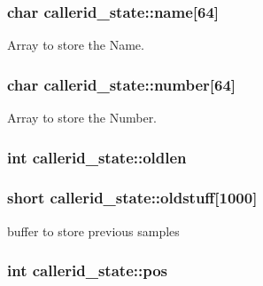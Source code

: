 \subsubsection[{name}]{\setlength{\rightskip}{0pt plus 5cm}char callerid\+\_\+state\+::name\mbox{[}64\mbox{]}}\label{structcallerid__state_a521ec0abccd42445c58230ba7cb4856d}


Array to store the Name. 

\hypertarget{structcallerid__state_af7151357841b78dcfcb62e58de1cbeb2}{}
\subsubsection[{number}]{\setlength{\rightskip}{0pt plus 5cm}char callerid\+\_\+state\+::number\mbox{[}64\mbox{]}}\label{structcallerid__state_af7151357841b78dcfcb62e58de1cbeb2}


Array to store the Number. 

\hypertarget{structcallerid__state_a39770e5775e3b30fd9b510b1354b13c3}{}
\subsubsection[{oldlen}]{\setlength{\rightskip}{0pt plus 5cm}int callerid\+\_\+state\+::oldlen}\label{structcallerid__state_a39770e5775e3b30fd9b510b1354b13c3}
\hypertarget{structcallerid__state_adab32a1be89ad9fac4a94bf77640d663}{}
\subsubsection[{oldstuff}]{\setlength{\rightskip}{0pt plus 5cm}short callerid\+\_\+state\+::oldstuff\mbox{[}1000\mbox{]}}\label{structcallerid__state_adab32a1be89ad9fac4a94bf77640d663}


buffer to store previous samples 

\hypertarget{structcallerid__state_a31b48e329478cd345750fd5311a483f1}{}
\subsubsection[{pos}]{\setlength{\rightskip}{0pt plus 5cm}int callerid\+\_\+state\+::pos}\label{structcallerid__state_a31b48e329478cd345750fd5311a483f1}
\hypertarget{structcallerid__state_a6a073312c8b127292ccd43573f46af1f}{}
